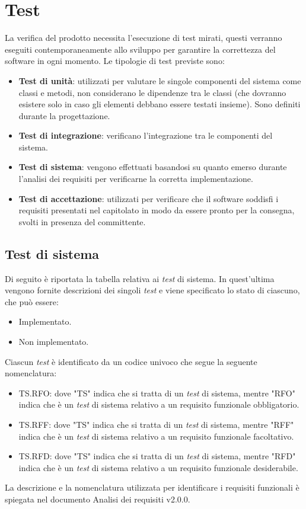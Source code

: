 \section{Test}
La verifica del prodotto necessita l'esecuzione di test mirati, questi verranno eseguiti contemporaneamente allo sviluppo per garantire la correttezza del software in ogni momento.
Le tipologie di test previste sono:
\begin{itemize}
	\item \textbf{Test di unità}: utilizzati per valutare le singole componenti del sistema come classi e metodi, non considerano le dipendenze tra le classi (che dovranno esistere solo in caso gli elementi debbano essere testati insieme).
	      Sono definiti durante la progettazione.
	\item \textbf{Test di integrazione}: verificano l'integrazione tra le componenti del sistema.
	\item \textbf{Test di sistema}: vengono effettuati basandosi su quanto emerso durante l'analisi dei requisiti per verificarne la corretta implementazione.
	\item \textbf{Test di accettazione}: utilizzati per verificare che il software soddisfi i requisiti presentati nel capitolato in modo da essere pronto per la consegna, svolti in presenza del committente.
\end{itemize}

\subsection{Test di sistema}
Di seguito è riportata la tabella relativa ai \textit{test} di sistema. In quest'ultima vengono fornite descrizioni
dei singoli \textit{test} e viene specificato lo stato di ciascuno, che può essere:
\begin{itemize}
	\item Implementato.
	\item Non implementato.
\end{itemize}
Ciascun \textit{test} è identificato da un codice univoco che segue la seguente nomenclatura:
\begin{itemize}
	\item TS.RFO: dove "TS" indica che si tratta di un \textit{test} di sistema, mentre "RFO" indica che è un \textit{test} di sistema relativo a un requisito funzionale obbligatorio.
	\item TS.RFF: dove "TS" indica che si tratta di un \textit{test} di sistema, mentre "RFF" indica che è un \textit{test} di sistema relativo a un requisito funzionale facoltativo.
	\item TS.RFD: dove "TS" indica che si tratta di un \textit{test} di sistema, mentre "RFD" indica che è un \textit{test} di sistema relativo a un requisito funzionale desiderabile.
\end{itemize}
La descrizione e la nomenclatura utilizzata per identificare i requisiti funzionali è spiegata nel documento Analisi dei requisiti v2.0.0.

